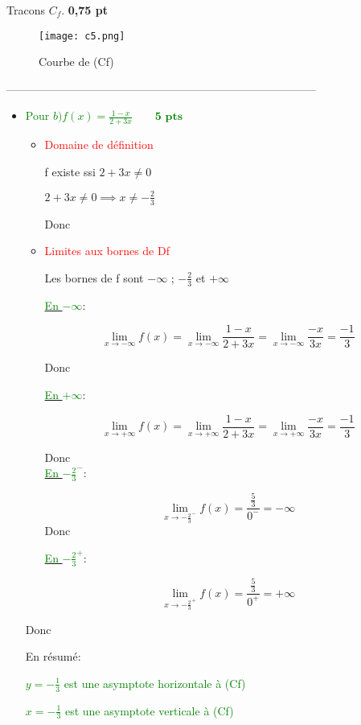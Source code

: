 \documentclass[12pt]{article}
\begin{document}
Tracons $C_f$. \textbf{0,75 pt}

\begin{center}
\begin{figure}[h]
\centering
\texttt{[image: c5.png]}
\caption{Courbe de (Cf)}
\label{fig:monimage}
\end{figure}
\end{center}

-----------------------------------------------------------------------------------

\begin{itemize}
\item \textcolor{green}{Pour $b)f(x)=\frac{1-x}{2+3x}\quad\quad\textbf{5 pts}$}
\begin{itemize}
\item \textcolor{red}{Domaine de définition}

f existe ssi $2+3x\neq 0$

$2+3x\neq 0 \implies x\neq-\frac{2}{3}$

Donc \textcolor{green}{}

\item \textcolor{red}{Limites aux bornes de Df}

Les bornes de f sont $-\infty$ ; $-\frac{2}{3}$ et $+\infty$

\underline{\textcolor{green}{En $-\infty $}}:

\[\lim_{x \to -\infty}f(x)=\lim_{x \to -\infty}\frac{1-x}{2+3x}=\lim_{x \to -\infty}\frac{-x}{3x}=\frac{-1}{3}\]

Donc \textcolor{green}{}

\underline{\textcolor{green}{En $+\infty $}}:

\[\lim_{x \to +\infty}f(x)=\lim_{x \to +\infty}\frac{1-x}{2+3x}=\lim_{x \to +\infty}\frac{-x}{3x}=\frac{-1}{3}\]

Donc \textcolor{green}{}\\

\underline{\textcolor{green}{En $-\frac{2}{3}^{-}$}}:

\[\lim_{x \to -\frac{2}{3}^{-}}f(x)=\frac{\frac{5}{3}}{0^{-}}=-\infty\]
Donc \textcolor{green}{}

\underline{\textcolor{green}{En $-\frac{2}{3}^{+}$}}:

\[\lim_{x \to -\frac{2}{3}^{+}}f(x)=\frac{\frac{5}{3}}{0^{+}}=+\infty\]
\end{itemize}

Donc \textcolor{green}{}

En résumé:

\textcolor{green}{$y=-\frac{1}{3}$ est une asymptote horizontale à (Cf)}

\textcolor{green}{$x=-\frac{1}{3}$ est une asymptote verticale à (Cf)}
\end{itemize}
\end{document}
